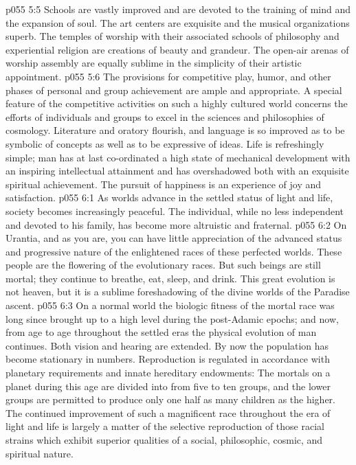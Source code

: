 \vs p055 5:5 Schools are vastly improved and are devoted to the training of mind and the expansion of soul. The art centers are exquisite and the musical organizations superb. The temples of worship with their associated schools of philosophy and experiential religion are creations of beauty and grandeur. The open\hyp{}air arenas of worship assembly are equally sublime in the simplicity of their artistic appointment.
\vs p055 5:6 The provisions for competitive play, humor, and other phases of personal and group achievement are ample and appropriate. A special feature of the competitive activities on such a highly cultured world concerns the efforts of individuals and groups to excel in the sciences and philosophies of cosmology. Literature and oratory flourish, and language is so improved as to be symbolic of concepts as well as to be expressive of ideas. Life is refreshingly simple; man has at last co\hyp{}ordinated a high state of mechanical development with an inspiring intellectual attainment and has overshadowed both with an exquisite spiritual achievement. The pursuit of happiness is an experience of joy and satisfaction.
\vs p055 6:1 As worlds advance in the settled status of light and life, society becomes increasingly peaceful. The individual, while no less independent and devoted to his family, has become more altruistic and fraternal.
\vs p055 6:2 On Urantia, and as you are, you can have little appreciation of the advanced status and progressive nature of the enlightened races of these perfected worlds. These people are the flowering of the evolutionary races. But such beings are still mortal; they continue to breathe, eat, sleep, and drink. This great evolution is not heaven, but it is a sublime foreshadowing of the divine worlds of the Paradise ascent.
\vs p055 6:3 On a normal world the biologic fitness of the mortal race was long since brought up to a high level during the post\hyp{}Adamic epochs; and now, from age to age throughout the settled eras the physical evolution of man continues. Both vision and hearing are extended. By now the population has become stationary in numbers. Reproduction is regulated in accordance with planetary requirements and innate hereditary endowments: The mortals on a planet during this age are divided into from five to ten groups, and the lower groups are permitted to produce only one half as many children as the higher. The continued improvement of such a magnificent race throughout the era of light and life is largely a matter of the selective reproduction of those racial strains which exhibit superior qualities of a social, philosophic, cosmic, and spiritual nature.
